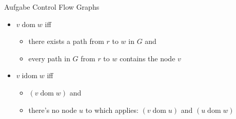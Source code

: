 \begin{frame}[allowframebreaks]{Aufgabe \thesection}{Control Flow Graphs}
  \begin{solutionnoinc}
    \begin{itemize}
      \item $v \operatorname{dom} w$ \alert{iff}
      \begin{itemize}
        \item \textcolor{SecondaryColor}{there exists a path from $r$ to $w$ in $G$} and
        \item every path in $G$ from $r$ to $w$ contains the node $v$
      \end{itemize}
      \item $v \operatorname{idom} w$ \alert{iff}
      \begin{itemize}
        \item $(v \operatorname{dom} w)$ and
        \item there's no node $u$ to which applies: $(v \operatorname{dom} u)$ and $(u \operatorname{dom} w)$
      \end{itemize}
    \end{itemize}
  \end{solutionnoinc}
\end{frame}
